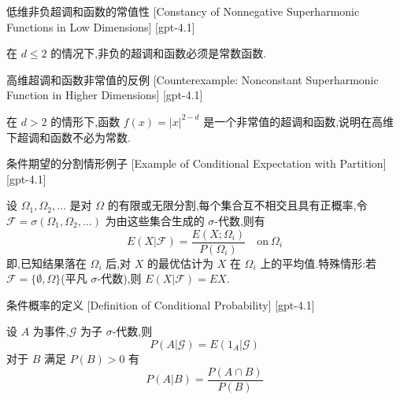 \documentclass[UTF8]{ctexart}
\begin{document}
    \begin{thm}
        {低维非负超调和函数的常值性}
        [Constancy of Nonnegative Superharmonic Functions in Low Dimensions]
        [gpt-4.1]
        
在 $d \leq 2$ 的情况下,非负的超调和函数必须是常数函数.

    \end{thm}
    
    
    
    \begin{cxmp}
        {高维超调和函数非常值的反例}
        [Counterexample: Nonconstant Superharmonic Function in Higher Dimensions]
        [gpt-4.1]
        
在 $d > 2$ 的情形下,函数 $f(x) = |x|^{2-d}$ 是一个非常值的超调和函数,说明在高维下超调和函数不必为常数.

    \end{cxmp}
    
    
    
    \begin{xmp}
        {条件期望的分割情形例子}
        [Example of Conditional Expectation with Partition]
        [gpt-4.1]
        
设 $\Omega_{1}, \Omega_{2}, \ldots$ 是对 $\Omega$ 的有限或无限分割,每个集合互不相交且具有正概率,令 $\mathcal{F} = \sigma(\Omega_{1}, \Omega_{2}, \ldots)$ 为由这些集合生成的 $\sigma$-代数,则有
\[
E(X | \mathcal{F}) = \frac{E(X ; \Omega_{i})}{P(\Omega_{i})} \quad \mathrm{on~} \Omega_{i}
\]
即,已知结果落在 $\Omega_{i}$ 后,对 $X$ 的最优估计为 $X$ 在 $\Omega_{i}$ 上的平均值.特殊情形:若 ${\mathcal{F}} = \{\emptyset, \Omega\}$(平凡 $\sigma$-代数),则 $E(X|{\mathcal{F}}) = E X$.

    \end{xmp}
    
    
    
    \begin{dfn}
        {条件概率的定义}
        [Definition of Conditional Probability]
        [gpt-4.1]
        
设 $A$ 为事件,$\mathcal{G}$ 为子 $\sigma$-代数,则
\[
P(A | \mathcal{G}) = E(1_{A} | \mathcal{G})
\]
对于 $B$ 满足 $P(B) > 0$ 有
\[
P(A | B) = \frac{P(A \cap B)}{P(B)}
\]

    \end{dfn}
    
\end{document}
